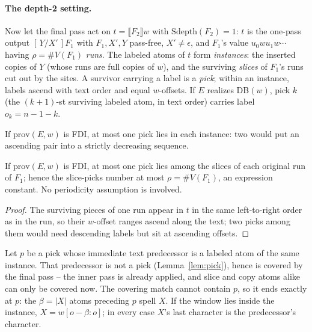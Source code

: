 \paragraph{The depth-2 setting.}
Now let the final pass act on $t = \llbracket F_2 \rrbracket w$ with
$\mathrm{Sdepth}(F_2) = 1$: $t$ is the one-pass output $[\,Y/X'\,]F_1$
with $F_1, X', Y$ pass-free, $X' \neq \epsilon$, and $F_1$'s value
$u_0 w u_1 w \cdots$ having $\rho = \#V(F_1)$ \emph{runs}.  The
labeled atoms of $t$ form \emph{instances}: the inserted copies of
$Y$ (whose runs are full copies of $w$), and the surviving
\emph{slices} of $F_1$'s runs cut out by the sites.  A survivor
carrying a label is a \emph{pick}; within an instance, labels ascend
with text order and equal $w$-offsets.  If $E$ realizes DB$(w)$,
pick $k$ (the $(k{+}1)$-st surviving labeled atom, in text order)
carries label $o_k = n-1-k$.

\begin{lemma}[pick]
    \label{lem:pick}
    If $\mathrm{prov}(E,w)$ is FDI, at most one pick lies in each
    instance: two would put an ascending pair into a strictly
    decreasing sequence.
\end{lemma}

\begin{lemma}[slice]
    \label{lem:slice}
    If $\mathrm{prov}(E,w)$ is FDI, at most one pick lies among the
    slices of each original run of $F_1$; hence the slice-picks
    number at most $\rho = \#V(F_1)$, an expression constant.  No
    periodicity assumption is involved.
\end{lemma}

\begin{proof}
    The surviving pieces of one run appear in $t$ in the same
    left-to-right order as in the run, so their $w$-offset ranges
    ascend along the text; two picks among them would need descending
    labels but sit at ascending offsets.
\end{proof}

\begin{lemma}[sandwich]
    \label{lem:sandwich}
    Let $p$ be a pick whose immediate text predecessor is a labeled
    atom of the same instance.  That predecessor is not a pick
    (Lemma~\ref{lem:pick}), hence is covered by the final pass -- the
    inner pass is already applied, and slice and copy atoms alike
    can only be covered now.  The covering match cannot contain $p$,
    so it ends exactly at $p$: the $\beta = |X|$ atoms preceding $p$
    spell $X$.  If the window lies inside the instance, $X =
    w[o-\beta : o]$; in every case $X$'s last character is the
    predecessor's character.
\end{lemma}

